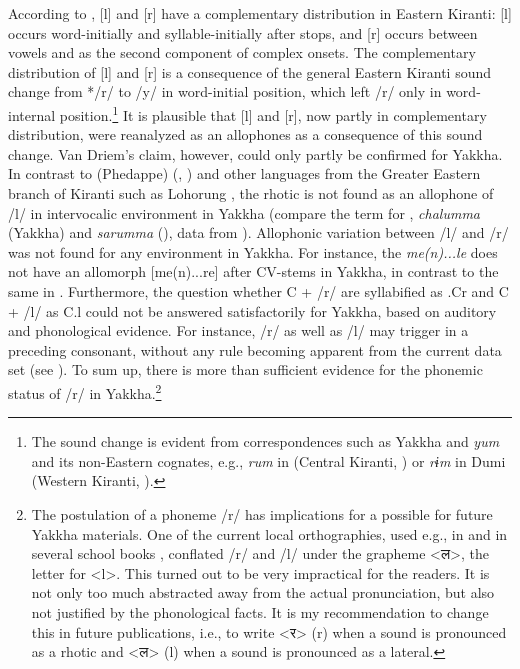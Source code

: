 \largerpage[-1]
According to  \cite{Driem1990The-fall}, [l] and [r] have a complementary distribution in Eastern Kiranti: [l] occurs word-initially and syllable-initially after stops, and [r] occurs between vowels and as the second component of complex onsets. The complementary distribution of [l] and [r] is a consequence of the general Eastern Kiranti sound change from */r/ to /y/ in word-initial position, which left /r/ only in word-internal position.\footnote{The sound change is evident from correspondences such as Yakkha and  \emph{yum}  and its non-Eastern cognates, e.g., \emph{rum} in  (Central Kiranti, \citealt[393]{Bickeletal2009Puma}) or \emph{rɨm} in Dumi (Western Kiranti, \citealt[412]{Driem1993A-grammar}).} It is plausible that [l] and [r], now partly in complementary distribution, were reanalyzed as an allophones as a consequence of this sound change.  Van Driem's claim, however, could only partly be confirmed for Yakkha. In contrast to (Phedappe)  (\citealt{Driem1987A-grammar}, \citealt[688]{Schieringetal2010The-prosodic}) and other languages from the Greater Eastern branch of Kiranti such as Lohorung \citep[85]{Driem1990The-fall}, the rhotic is not found as an allophone of /l/ in intervocalic environment in Yakkha (compare the term for , \emph{chalumma} (Yakkha) and \emph{sarumma} (),  data from \citet[131]{Driem1985_LimbuKin}). Allophonic variation between /l/ and /r/ was not found for any environment in Yakkha. 
\largerpage[-2]
For instance, the  \emph{me(n)...le} does not have an allomorph [me(n)...re] after CV-stems in Yakkha, in contrast to the same  in . Furthermore, the question whether C + /r/ are syllabified as .Cr and C + /l/ as C.l could not be answered satisfactorily for Yakkha, based on auditory and phonological evidence. For instance, /r/ as well as /l/ may trigger  in a preceding consonant, without any rule becoming apparent from the current data set (see ). To sum up, there is more than sufficient evidence for the phonemic status of /r/ in Yakkha.\footnote{The postulation of a phoneme /r/ has implications for a possible  for future Yakkha materials. One of the current local orthographies, used e.g., in \citet{Kongren2007Yakkha} and in several school books \citep{Jimi2009Engka-Yakkha}, conflated /r/ and /l/ under the grapheme <{\Deva ल}>, the  letter for <l>. This turned out to be very impractical for the readers. It is not only too much abstracted away from the actual pronunciation, but also not justified by the phonological facts. It is my recommendation to change this in future publications, i.e., to write <{\Deva र}> (r) when a sound is pronounced as a rhotic and <{\Deva ल}> (l) when a sound is pronounced as a lateral.}



